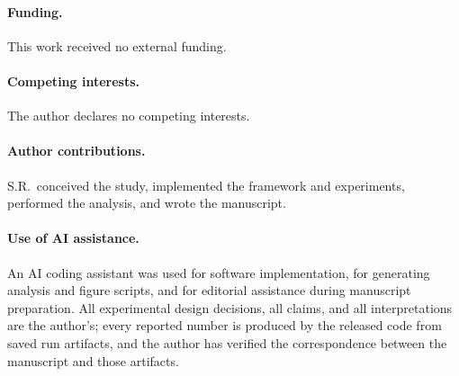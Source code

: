 \paragraph{Funding.} This work received no external funding.

\paragraph{Competing interests.} The author declares no competing interests.

\paragraph{Author contributions.} S.R.\ conceived the study, implemented the
framework and experiments, performed the analysis, and wrote the manuscript.

\paragraph{Use of AI assistance.} An AI coding assistant was used for software
implementation, for generating analysis and figure scripts, and for editorial
assistance during manuscript preparation. All experimental design decisions,
all claims, and all interpretations are the author's; every reported number is
produced by the released code from saved run artifacts, and the author has
verified the correspondence between the manuscript and those artifacts.
